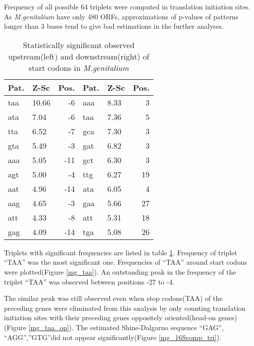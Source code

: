 Frequency of all possible 64 triplets were computed in translation
initiation sites. As {\it M.genitalium} have only 480 ORFs,
approximations of p-values of patterns longer than 3 bases tend to
give bad estimations in the further analyses.

\begin{table}
\begin{center}
\begin{tabular}{|llr|llr|}
\hline
Pat. & Z-Sc & Pos. & Pat. & Z-Sc & Pos. \\
\hline
taa & 10.66 & -6 & aaa & 8.33 & 3 \\
ata & 7.04 & -6 & taa & 7.36 & 5 \\
tta & 6.52 & -7 & gca & 7.30 & 3 \\
gta & 5.49 & -3 & gat & 6.82 & 3 \\
aaa & 5.05 & -11 & gct & 6.30 & 3 \\
agt & 5.00 & -4 & ttg & 6.27 & 19 \\
aat & 4.96 & -14 & ata & 6.05 & 4 \\
aag & 4.65 & -3 & gaa & 5.66 & 27 \\
att & 4.33 & -8 & att & 5.31 & 18 \\
gag & 4.09 & -14 & tga & 5.08 & 26 \\
\hline
\end{tabular}
\end{center}
\caption{Statistically significant observed upstream(left) and downstream(right) of start codons in {\it M.genitalium}}
\label{mgen_sig}
\end{table}

Triplets with significant frequencies are listed in table
\ref{mgen_sig}.  Frequency of triplet ``TAA'' was the most significant
one.  Frequencies of ``TAA'' around start codons were plotted(Figure
\ref{mg_taa}).  An outstanding peak in the frequency of the triplet
``TAA'' was observed between positions -27 to -4.

The similar peak was still observed even when stop codons(TAA) of the
preceding genes were eliminated from this analysis by only counting
translation initiation sites with their preceding genes oppositely
oriented(head-on genes)(Figure \ref{mg_taa_op}).  The estimated
Shine-Dalgarno sequence ``GAG'', ``AGG'',''GTG''did not appear
significantly(Figure \ref{mg_16Scomp_tri}).

